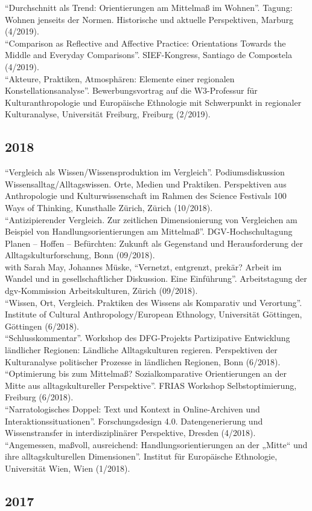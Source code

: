 \enquote{Durchschnitt als Trend: Orientierungen am Mittelmaß im Wohnen}. Tagung: Wohnen jenseits der Normen. Historische und aktuelle Perspektiven, Marburg (4/2019).\\[.25cm]\enquote{Comparison as Reflective and Affective Practice: Orientations Towards the Middle and Everyday Comparisons}. SIEF-Kongress, Santiago de Compostela (4/2019).\\[.25cm]\enquote{Akteure, Praktiken, Atmosphären: Elemente einer regionalen Konstellationsanalyse}. Bewerbungsvortrag auf die W3-Professur für Kulturanthropologie und Europäische Ethnologie mit Schwerpunkt in regionaler Kulturanalyse, Universität Freiburg, Freiburg (2/2019).\subsection*{2018}
\enquote{Vergleich als Wissen/Wissensproduktion im Vergleich}. Podiumsdiskussion Wissensalltag/Alltagswissen. Orte, Medien und Praktiken. Perspektiven aus Anthropologie und Kulturwissenschaft im Rahmen des Science Festivals 100 Ways of Thinking, Kunsthalle Zürich, Zürich (10/2018).\\[.25cm]\enquote{Antizipierender Vergleich. Zur zeitlichen Dimensionierung von Vergleichen am Beispiel von Handlungsorientierungen am Mittelmaß}. DGV-Hochschultagung Planen – Hoffen – Befürchten: Zukunft als Gegenstand und Herausforderung der Alltagskulturforschung, Bonn (09/2018).\\[.25cm]with Sarah May, Johannes Müske, \enquote{Vernetzt, entgrenzt, prekär? Arbeit im Wandel und in gesellschaftlicher Diskussion. Eine Einführung}. Arbeitstagung der dgv-Kommission Arbeitskulturen, Zürich (09/2018).\\[.25cm]\enquote{Wissen, Ort, Vergleich. Praktiken des Wissens als Komparativ und Verortung}. Institute of Cultural Anthropology/European Ethnology, Universität Göttingen, Göttingen (6/2018).\\[.25cm]\enquote{Schlusskommentar}. Workshop des DFG-Projekts Partizipative Entwicklung ländlicher Regionen: Ländliche Alltagskulturen regieren. Perspektiven der Kulturanalyse politischer Prozesse in ländlichen Regionen, Bonn (6/2018).\\[.25cm]\enquote{Optimierung bis zum Mittelmaß? Sozialkomparative Orientierungen an der Mitte aus alltagskultureller Perspektive}. FRIAS Workshop Selbstoptimierung, Freiburg (6/2018).\\[.25cm]\enquote{Narratologisches Doppel: Text und Kontext in Online-Archiven und Interaktionssituationen}. Forschungsdesign 4.0. Datengenerierung und Wissenstransfer in interdisziplinärer Perspektive, Dresden (4/2018).\\[.25cm]\enquote{Angemessen, maßvoll, ausreichend: Handlungsorientierungen an der „Mitte“ und ihre alltagskulturellen Dimensionen}. Institut für Europäische Ethnologie, Universität Wien, Wien (1/2018).\subsection*{2017}
